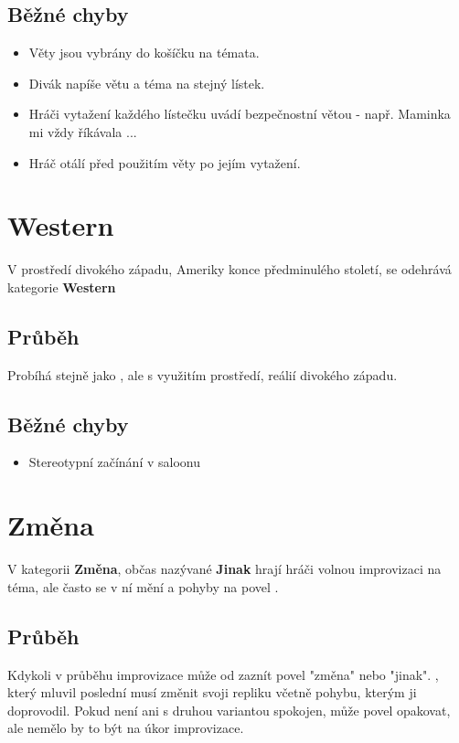 \documentclass[main.tex]{subfiles}
\begin{document}
 
\subsection{ Běžné chyby } \begin{itemize}
\item Věty jsou vybrány do košíčku na témata.
\item Divák napíše větu a téma na stejný lístek.
\item Hráči vytažení každého lístečku uvádí bezpečnostní větou - např. Maminka mi vždy říkávala ...
\item Hráč otálí před použitím věty po jejím vytažení.
\end{itemize}
 
 
 
 
 
\needspace{5cm} \section{Western} \label{western}  
 
V prostředí divokého západu, Ameriky konce předminulého století, se odehrává kategorie \textbf{Western}{} 
 
\subsection{Průběh} Probíhá stejně jako , ale s využitím prostředí, reálií divokého západu.  
 
\subsection{Běžné chyby} \begin{itemize}
\item Stereotypní začínání v saloonu
\end{itemize}
 
 
 
 
\needspace{5cm} \section{Změna} \label{změna}  
 
 
V kategorii \textbf{Změna}{}, občas nazývané \textbf{Jinak}{} hrají hráči volnou improvizaci na téma, ale často se v ní mění  a pohyby na povel . 
 
 
\subsection{ Průběh } Kdykoli v průběhu improvizace může od  zaznít povel "změna"{} nebo "jinak". , který mluvil poslední musí změnit svoji repliku včetně pohybu, kterým ji doprovodil. Pokud není  ani s druhou variantou spokojen, může povel opakovat, ale nemělo by to být na úkor improvizace. 
 
\end{document}
